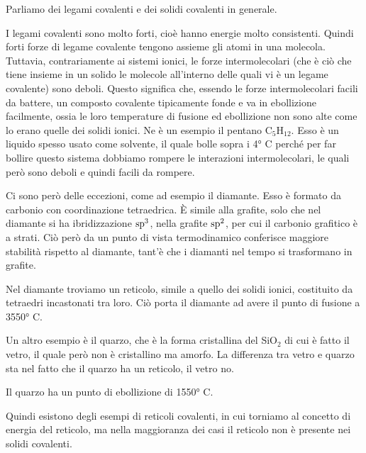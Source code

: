 Parliamo dei legami covalenti e dei solidi covalenti in generale. 

I legami covalenti sono molto forti, cioè hanno energie molto consistenti. Quindi forti forze di legame covalente tengono assieme gli atomi in una molecola. Tuttavia, contrariamente ai sistemi ionici, le forze intermolecolari (che è ciò che tiene insieme in un solido le molecole all'interno delle quali vi è un legame covalente) sono deboli. Questo significa che, essendo le forze intermolecolari facili da battere, un composto covalente tipicamente fonde e va in ebollizione facilmente, ossia le loro temperature di fusione ed ebollizione non sono alte come lo erano quelle dei solidi ionici. Ne è un esempio il pentano C$_5$H$_{12}$. Esso è un liquido spesso usato come solvente, il quale bolle sopra i 4° C perché per far bollire questo sistema dobbiamo rompere le interazioni intermolecolari, le quali però sono deboli e quindi facili da rompere.

Ci sono però delle eccezioni, come ad esempio il diamante. Esso è formato da carbonio con coordinazione tetraedrica. È simile alla grafite, solo che nel diamante si ha ibridizzazione $\rm sp^3$, nella grafite $\rm sp^2$, per cui il carbonio grafitico è a strati. Ciò però da un punto di vista termodinamico conferisce maggiore stabilità rispetto al diamante, tant'è che i diamanti nel tempo si trasformano in grafite.

Nel diamante troviamo un reticolo, simile a quello dei solidi ionici, costituito da tetraedri incastonati tra loro. Ciò porta il diamante ad avere il punto di fusione a 3550° C.

\vspace{0.2cm} Un altro esempio è il quarzo, che è la forma cristallina del SiO$_2$ di cui è fatto il vetro, il quale però non è cristallino ma amorfo. La differenza tra vetro e quarzo sta nel fatto che il quarzo ha un reticolo, il vetro no.

Il quarzo ha un punto di ebollizione di 1550° C.

Quindi esistono degli esempi di reticoli covalenti, in cui torniamo al concetto di energia del reticolo, ma nella maggioranza dei casi il reticolo non è presente nei solidi covalenti.


